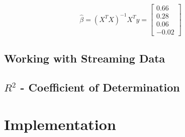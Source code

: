 \begin{equation}
    \hat{\beta} = (X^TX)^{-1} X^Ty =
    \begin{bmatrix}
        0.66 \\
        0.28 \\
        0.06 \\
        -0.02
    \end{bmatrix}
\end{equation}

\subsection{Working with Streaming Data}

\subsection{$ R^2 $ - Coefficient of Determination}

\section{Implementation}

